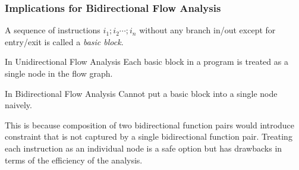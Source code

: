 \documentclass{beamer}
\newcommand{\Pow}{\mathcal{P}}
\newcommand{\tomon}{\to_{\mathrm{mon}}}
\begin{document}
\begin{frame}
  \frametitle{Implications for Bidirectional Flow Analysis}
  A sequence of instructions $i_{1};i_{2}\cdots;i_{n}$ without any branch in/out except for entry/exit is called a \emph{basic block}.
  \begin{block}{In Unidirectional Flow Analysis}
    Each basic block in a program is treated as a single node in the flow graph.
  \end{block}
  \begin{block}{In Bidirectional Flow Analysis}
    Cannot put a basic block into a single node naively.
  \end{block}
  This is because composition of two bidirectional function pairs would introduce constraint that is not captured by a single bidirectional function pair. Treating each instruction as an individual node is a safe option but has drawbacks in terms of the efficiency of the analysis.
\end{frame}



%
\end{document}
